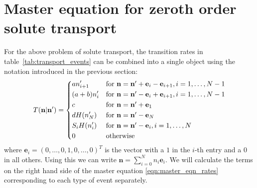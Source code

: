 \documentclass[a4paper,11pt]{article}
\numberwithin{equation}{section}
\newcommand{\V}[1]{\mathbf{#1}}
\begin{document}
\section{Master equation for zeroth order solute transport}
For the above problem of solute transport, the transition rates in
table~\ref{tab:transport_events} can be combined into a single object using the
notation introduced in the previous section:
\begin{equation}
    \label{eqn:transition_rates_zeroth_order}
    T(\V{n}|\V{n}') =%
        \begin{dcases*}
            a n'_{i+1} & for \(\V{n} = \V{n}' + \V{e}_i - \V{e}_{i+1},
            i=1,\dotsc,N-1\)\\
            (a+b) n'_i & for \(\V{n} = \V{n}' - \V{e}_i + \V{e}_{i+1},
            i=1,\dotsc,N-1\)\\
            c & for \(\V{n} = \V{n}' + \V{e}_1\)\\
            d H(n'_N) & for \(\V{n} = \V{n}' - \V{e}_N\)\\
            S_i H(n'_i) & for \(\V{n} = \V{n}' - \V{e}_i, i=1,\dotsc,N\)\\
            0 & otherwise
        \end{dcases*}
\end{equation}
where \(\V{e}_i = (0,\dotsc,0,1,0,\dotsc,0)^T\) is the vector with a \(1\) in
the \(i\)-th entry and a \(0\) in all others. Using this we can write \(\V{n} =
\sum_{i=0}^{N} n_i \V{e}_i\). We will calculate the terms on the right hand side
of the master equation \eqref{eqn:master_eqn_rates} corresponding to each type
of event separately.
\end{document}
